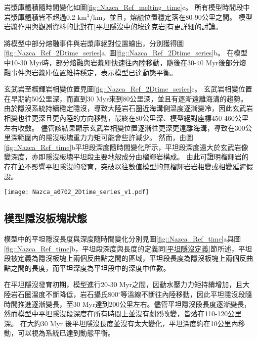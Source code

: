 岩漿庫體積隨時間變化如圖\ref{fig::Nazca_Ref_melting_time}c。
所有模型時間段中岩漿庫體積皆不超過0.2 km$^3$/km，並且，熔融位置穩定落在80-90公里之間。
模型岩漿作用與觀測資料的比對在\ref{平坦隱沒中的埃達克岩}有更詳細的討論。


將模型中部分熔融事件與岩漿庫絕對位置繪出，分別獲得圖\ref{fig::Nazca_Ref_2Dtime_series}a, 圖\ref{fig::Nazca_Ref_2Dtime_series}b。
在模型中10-30 Myr時，部分熔融與岩漿庫快速往內陸移動，隨後在30-40 Myr後部分熔融事件與岩漿庫位置維持穩定，表示模型已達動態平衡。

玄武岩至榴輝岩相變位置見圖\ref{fig::Nazca_Ref_2Dtime_series}c。
玄武岩相變位置在早期約50公里深，而直到30 Myr來到80公里深，並且有逐漸遠離海溝的趨勢。
由於隱沒系統持續穩定隱沒，導致大陸岩石圈近海溝側溫度逐漸變冷，因此玄武岩相變也往更深且更內陸的方向移動，最終在80公里深、模型絕對座標450-460公里左右收斂。
儘管該結果顯示玄武岩相變位置逐漸往更深更遠離海溝，導致在300公里深範圍內的隱沒板塊重力力矩可能會些許減少。
然而，由圖\ref{fig::Nazca_Ref_time}b平坦段深度隨時間變化所示，平坦段深度遠大於玄武岩像變深度，亦即隱沒板塊平坦段主要地殼成分由榴輝岩構成。
由此可證明榴輝岩的存在並不影響平坦隱沒的發育，突破以往數值模型的無榴輝岩岩相變或相變延遲假設。
\begin{figure*}[h]
    \centering
    \texttt{[image: Nazca\_a0702\_2Dtime\_series\_v1.pdf]}
    \caption[智利參考模型部分熔融、岩漿庫與玄武岩相變時空關係圖]{智利參考模型部分熔融、岩漿庫與玄武岩相變位置時空關係圖。(a)圓點為智利參考模型不同時間的部分熔融發生位置，線條為每10 Myr的隱沒板塊頂部介面(分別為10 Myr, 20nMyr, 30 Myr, 40 Myr與50 Myr)，橫軸上方標示出模型於40 Myr的相對海溝距離。(b)圓點為智利參考模型不同時間的岩漿庫發生位置，線條為每10 Myr的隱沒板塊頂部介面(分別為10 Myr, 20 Myr, 30 Myr, 40 Myr與50 Myr)，橫軸上方標示出模型於40 Myr的相對海溝距離。(c)圓點為智利參考模型不同時間之玄武岩相變位置。}
    \label{fig::Nazca_Ref_2Dtime_series}
\end{figure*}

\newpage
\subsection{模型隱沒板塊狀態}
模型中的平坦隱沒長度與深度隨時間變化分別見圖\ref{fig::Nazca_Ref_time}a與圖\ref{fig::Nazca_Ref_time}b，平坦段深度與長度的定義同\ref{平坦隱沒定義}節所述，平坦段被定義為隱沒板塊上兩個反曲點之間的區域，平坦段長度為隱沒板塊上兩個反曲點之間的長度，而平坦深度為平坦段中的深度中位數。

在平坦隱沒發育初期，模型進行20-30 Myr之間，因動水壓力力矩持續增加，且大陸岩石圈溫度不斷降低，岩石攝氏800$^{\circ}$等溫線不斷往內陸移動，因此平坦隱沒段隨時間推進逐漸變長，至30 Myr達到200公里左右。儘管平坦隱沒段長度逐漸變長，然而模型中平坦隱沒段深度在所有時間上並沒有劇烈改變，皆落在110-120公里深。
在大約30 Myr 後平坦隱沒長度並沒有太大變化，平坦深度約在10公里內移動，可以視為系統已達到動態平衡。

